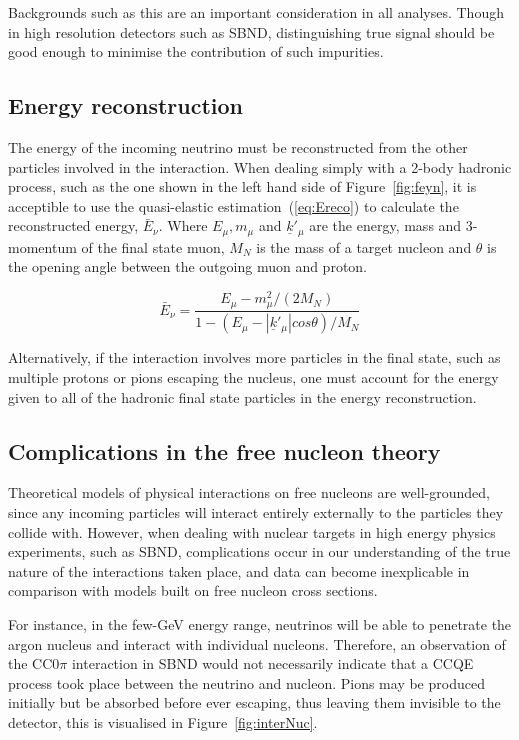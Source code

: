     Backgrounds such as this are an important consideration in all analyses. Though in high resolution detectors such as SBND, distinguishing true signal should be good enough to minimise the contribution of such impurities. 

\subsection{Energy reconstruction}

    The energy of the incoming neutrino must be reconstructed from the other particles involved in the interaction. When dealing simply with a 2-body hadronic process, such as the one shown in the left hand side of Figure~\ref{fig:feyn}, it is acceptible to use the quasi-elastic estimation~(\ref{eq:Ereco}) \cite{teppei} to calculate the reconstructed energy, $\bar{E}_{\nu}$. Where $E_{\mu}, m_{\mu}$ and $\underline{k}'_{\mu}$ are the energy, mass and 3-momentum of the final state muon, $M_{N}$ is the mass of a target nucleon and $\theta$ is the opening angle between the outgoing muon and proton.  


    \begin{equation}\label{eq:Ereco}
        \bar{E}_{\nu} = \frac{ E_{\mu} - m^{2}_{\mu} / (2M_{N}) }{ 1 - ( E_{\mu} - |\underline{k}'_{\mu}| cos \theta ) / M_{N} }
    \end{equation}

Alternatively, if the interaction involves more particles in the final state, such as multiple protons or pions escaping the nucleus, one must account for the energy given to all of the hadronic final state particles in the energy reconstruction. 

\subsection{Complications in the free nucleon theory}

Theoretical models of physical interactions on free nucleons are well-grounded, since any incoming particles will interact entirely externally to the particles they collide with. However, when dealing with nuclear targets in high energy physics experiments, such as SBND, complications occur in our understanding of the true nature of the interactions taken place, and data can become inexplicable in comparison with models built on free nucleon cross sections. 

For instance, in the few-GeV energy range, neutrinos will be able to penetrate the argon nucleus and interact with individual nucleons. Therefore, an observation of the CC0\(\pi\) interaction in SBND would not necessarily indicate that a CCQE process took place between the neutrino and nucleon. Pions may be produced initially but be absorbed before ever escaping, thus leaving them invisible to the detector, this is visualised in Figure~\ref{fig:interNuc}.

